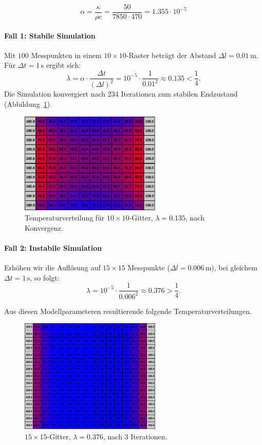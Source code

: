 \[
\alpha =
\frac{\kappa}{\rho c}
=
\frac{50}{7850 \cdot 470}
= 1.355 \cdot 10^{-5}
\]

\paragraph{Fall 1: Stabile Simulation}  
Mit \(100\) Messpunkten in einem \(10\times 10\)-Raster beträgt der Abstand \(\Delta l = 0.01\,\mathrm{m}\).  
Für \(\Delta t = 1\,\mathrm{s}\) ergibt sich:
\[
\lambda =
\alpha \cdot \frac{\Delta t}{(\Delta l)^2}
=
10^{-5} \cdot \frac{1}{0.01^2}
\approx 0.135 < \frac14.
\]
Die Simulation konvergiert nach 234 Iterationen zum stabilen Endzustand (Abbildung~\ref{parallelisierung:fig:simulation_10x10_0.135}).

\begin{figure}[htbp]
	\centering
	\includegraphics[width=0.6\textwidth]{papers/parallelisierung/images/simulation_10x10_0.135.pdf}
	\caption{Temperaturverteilung für \(10\times 10\)-Gitter, \(\lambda = 0.135\), nach Konvergenz.}
	\label{parallelisierung:fig:simulation_10x10_0.135}
\end{figure}

\paragraph{Fall 2: Instabile Simulation}  
Erhöhen wir die Auflösung auf \(15\times 15\) Messpunkte (\(\Delta l = 0.006\,\mathrm{m}\)), bei gleichem \(\Delta t = 1\,\mathrm{s}\), so folgt:
\[
\lambda =
10^{-5} \cdot \frac{1}{0.006^2}
\approx 0.376 > \frac14.
\]

Aus diesen Modellparameteren resultierende folgende Temperaturverteilungen.

\begin{figure}[htbp]
	\centering
	\includegraphics[width=0.6\textwidth]{papers/parallelisierung/images/simulation_15x15_0.376_3it.pdf}
	\caption{\(15\times 15\)-Gitter, \(\lambda = 0.376\), nach 3 Iterationen.}
	\label{parallelisierung:fig:simulation_15x15_0.376_3it}
\end{figure}

